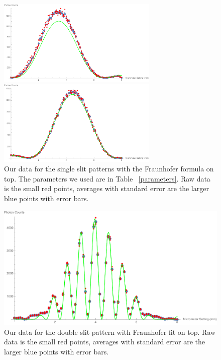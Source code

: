 \documentclass[prb,preprint]{revtex4-1}
\begin{document}
\begin{figure}[h!]
\centering
\begin{minipage}[b]{0.45\linewidth}
	\includegraphics[width=3in]{far_slit_Fraunhofer_plot.pdf}
\end{minipage}
\quad
\begin{minipage}[b]{0.45\linewidth}
	\includegraphics[width=3in]{near_slit_Fraunhofer_plot.pdf}
\end{minipage}
\caption{Our data for the single slit patterns with the Fraunhofer formula on top. The parameters we used are in Table ~\ref{parameters}. Raw data is the small red points, averages with standard error are the larger blue points with error bars. }
\label{single_slits_Fraunhofer_plot}
\end{figure}

\begin{figure}[h!]
\centering
\includegraphics[width=6in]{double_slit_Fraunhofer_plot.pdf}
\caption{Our data for the double slit pattern with Fraunhofer fit on top.  Raw data is the small red points, averages with standard error are the larger blue points with error bars. }
\label{double_slit_Fraunhofer_plot}
\end{figure}
\end{document}
